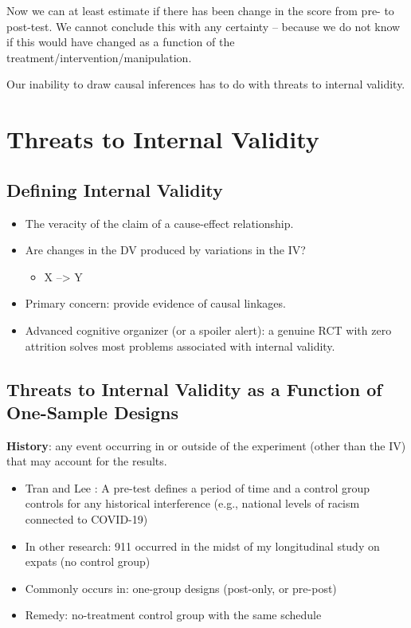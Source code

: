 \documentclass[
  english,
]{book}
\providecommand{\tightlist}{%
  \setlength{\itemsep}{0pt}\setlength{\parskip}{0pt}}
\begin{document}
Now we can at least estimate if there has been change in the score from pre- to post-test. We cannot conclude this with any certainty -- because we do not know if this would have changed as a function of the treatment/intervention/manipulation.

Our inability to draw causal inferences has to do with threats to internal validity.

\hypertarget{threats-to-internal-validity}{%
\section{Threats to Internal Validity}\label{threats-to-internal-validity}}

\hypertarget{defining-internal-validity}{%
\subsection{Defining Internal Validity}\label{defining-internal-validity}}

\begin{itemize}
\tightlist
\item
  The veracity of the claim of a cause-effect relationship.
\item
  Are changes in the DV produced by variations in the IV?

  \begin{itemize}
  \tightlist
  \item
    X --\textgreater{} Y
  \end{itemize}
\item
  Primary concern: provide evidence of causal linkages.
\item
  Advanced cognitive organizer (or a spoiler alert): a genuine RCT with zero attrition solves most problems associated with internal validity.
\end{itemize}

\hypertarget{threats-to-internal-validity-as-a-function-of-one-sample-designs}{%
\subsection{Threats to Internal Validity as a Function of One-Sample Designs}\label{threats-to-internal-validity-as-a-function-of-one-sample-designs}}

\textbf{History}: any event occurring in or outside of the experiment (other than the IV) that may account for the results.

\begin{itemize}
\tightlist
\item
  Tran and Lee \citeyearpar{tran_you_2014}: A pre-test defines a period of time and a control group controls for any historical interference (e.g., national levels of racism connected to COVID-19)
\item
  In other research: 911 occurred in the midst of my longitudinal study on expats (no control group)
\item
  Commonly occurs in: one-group designs (post-only, or pre-post)
\item
  Remedy: no-treatment control group with the same schedule
\end{itemize}
\end{document}
